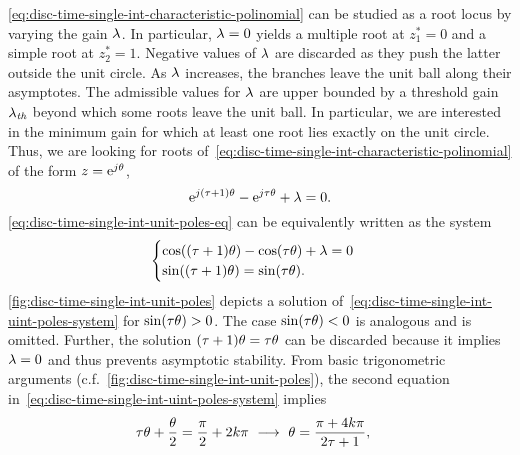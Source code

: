 \cref{eq:disc-time-single-int-characteristic-polinomial} can be studied as a root locus
by varying the gain $ \lambda $.
In particular, $ \lambda = 0 $ yields
a multiple root at $ z_1^* = 0 $ and a simple root at $ z_2^* = 1 $.
Negative values of $ \lambda $ are discarded as they push the latter outside the unit circle.
As $ \lambda $ increases,
the branches leave the unit ball along their asymptotes.
The admissible values for $ \lambda $ are upper bounded by a threshold gain $ \lambda_{\textit{th}} $
beyond which some roots leave the unit ball.
In particular, we are interested in the minimum gain for which at least one root lies exactly on the unit circle.
Thus, we are looking for roots of~\eqref{eq:disc-time-single-int-characteristic-polinomial}
of the form $ z = \mathrm{e}^{j\theta} $,
\begin{equation}\label{eq:disc-time-single-int-unit-poles-eq}
	\mathrm{e}^{j(\tau+1)\theta} - \mathrm{e}^{j\tau\theta} + \lambda = 0.
\end{equation}
\cref{eq:disc-time-single-int-unit-poles-eq} can be equivalently written as the system
\begin{equation}\label{eq:disc-time-single-int-uint-poles-system}
	\begin{cases}
		\cos((\tau+1)\theta) - \cos(\tau\theta) + \lambda = 0\\
		\sin((\tau+1)\theta) = \sin(\tau\theta).
	\end{cases}
\end{equation}
\autoref{fig:disc-time-single-int-unit-poles} depicts a solution of~\eqref{eq:disc-time-single-int-uint-poles-system} for $ \sin(\tau\theta) > 0 $.
The case $ \sin(\tau\theta)<0 $ is analogous
and is omitted.
Further, the solution $ (\tau+1)\theta = \tau\theta $
can be discarded because it implies $ \lambda = 0 $ and thus prevents asymptotic stability.
From basic trigonometric arguments (c.f.~\autoref{fig:disc-time-single-int-unit-poles}),
the second equation in~\eqref{eq:disc-time-single-int-uint-poles-system} implies
\begin{equation}\label{eq:disc-time-single-int-theta}
	\delayn\theta + \dfrac{\theta}{2} = \dfrac{\pi}{2} + 2k\pi \ \longrightarrow \ \theta = \dfrac{\pi+4k\pi}{2\delayn+1}, \quad 
\end{equation}
